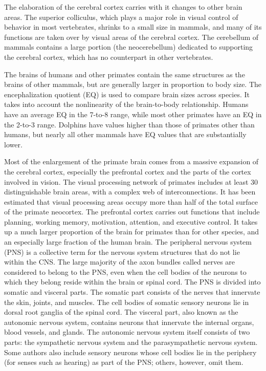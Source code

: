 \documentclass[]{book}
\begin{document}
The elaboration of the cerebral cortex carries with it changes to other brain areas. The superior colliculus, which plays a major role in visual control of behavior in most vertebrates, shrinks to a small size in mammals, and many of its functions are taken over by visual areas of the cerebral cortex. The cerebellum of mammals contains a large portion (the neocerebellum) dedicated to supporting the cerebral cortex, which has no counterpart in other vertebrates.

The brains of humans and other primates contain the same structures as the brains of other mammals, but are generally larger in proportion to body size. The encephalization quotient (EQ) is used to compare brain sizes across species. It takes into account the nonlinearity of the brain-to-body relationship. Humans have an average EQ in the 7-to-8 range, while most other primates have an EQ in the 2-to-3 range. Dolphins have values higher than those of primates other than humans, but nearly all other mammals have EQ values that are substantially lower.

Most of the enlargement of the primate brain comes from a massive expansion of the cerebral cortex, especially the prefrontal cortex and the parts of the cortex involved in vision. The visual processing network of primates includes at least 30 distinguishable brain areas, with a complex web of interconnections. It has been estimated that visual processing areas occupy more than half of the total surface of the primate neocortex. The prefrontal cortex carries out functions that include planning, working memory, motivation, attention, and executive control. It takes up a much larger proportion of the brain for primates than for other species, and an especially large fraction of the human brain.
The peripheral nervous system (PNS) is a collective term for the nervous system structures that do not lie within the CNS. The large majority of the axon bundles called nerves are considered to belong to the PNS, even when the cell bodies of the neurons to which they belong reside within the brain or spinal cord. The PNS is divided into somatic and visceral parts. The somatic part consists of the nerves that innervate the skin, joints, and muscles. The cell bodies of somatic sensory neurons lie in dorsal root ganglia of the spinal cord. The visceral part, also known as the autonomic nervous system, contains neurons that innervate the internal organs, blood vessels, and glands. The autonomic nervous system itself consists of two parts: the sympathetic nervous system and the parasympathetic nervous system. Some authors also include sensory neurons whose cell bodies lie in the periphery (for senses such as hearing) as part of the PNS; others, however, omit them.
\end{document}
